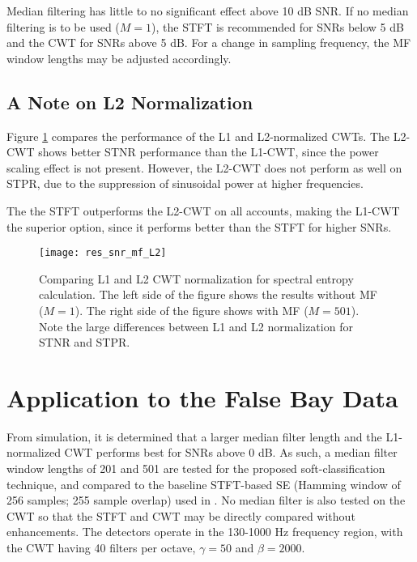 Median filtering has little to no significant effect above 10 dB SNR. If no median filtering is to be used ($M=1$), the STFT is recommended for SNRs below 5 dB and the CWT for SNRs above 5 dB. For a change in sampling frequency, the MF window lengths may be adjusted accordingly.



\subsection{A Note on L2 Normalization}

Figure \ref{fig:res_snr_mf_L2} compares the performance of the L1 and L2-normalized CWTs. The L2-CWT shows better STNR performance than the L1-CWT, since the power scaling effect is not present. However, the L2-CWT does not perform as well on STPR, due to the suppression of sinusoidal power at higher frequencies. 

The the STFT outperforms the L2-CWT on all accounts, making the L1-CWT the superior option, since it performs better than the STFT for higher SNRs.


\begin{figure}[h!]
	\centering
	\texttt{[image: res\_snr\_mf\_L2]}
	\caption[Comparing L1 and L2 CWT normalization for spectral entropy calculation.]{Comparing L1 and L2 CWT normalization for spectral entropy calculation. The left side of the figure shows the results without MF ($M=1$). The right side of the figure shows with MF ($M=501$). Note the large differences between L1 and L2 normalization for STNR and STPR.}
	\label{fig:res_snr_mf_L2}
\end{figure}

\section{Application to the False Bay Data}

From simulation, it is determined that a larger median filter length and the L1-normalized CWT performs best for SNRs above 0 dB. As such, a median filter window lengths of 201 and 501 are tested for the proposed soft-classification technique, and compared to the baseline STFT-based SE (Hamming window of 256 samples; 255 sample overlap) used in \citep{entropyJASA}. No median filter is also tested on the CWT so that the STFT and CWT may be directly compared without enhancements. The detectors operate in the 130-1000 Hz frequency region, with the CWT having 40 filters per octave, $\gamma = 50$ and $\beta = 2000$.



